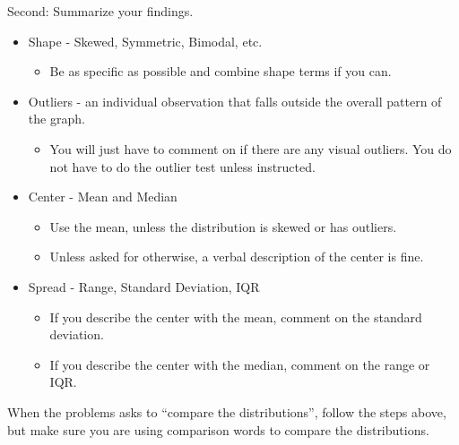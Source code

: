 \documentclass[../stats.tex]{subfiles}
\begin{document}
Second: Summarize your findings. 
\begin{itemize}
    \item Shape - Skewed, Symmetric, Bimodal, etc. 
    \begin{itemize}
        \item Be as specific as possible and combine shape terms if you can.
    \end{itemize}
    \item Outliers - an individual observation that falls outside the overall pattern of the graph.
    \begin{itemize}
        \item You will just have to comment on if there are any visual outliers. You do not have to do the outlier test unless instructed.
    \end{itemize}
    \item Center - Mean and Median 
    \begin{itemize}
        \item Use the mean, unless the distribution is skewed or has outliers. 
        \item Unless asked for otherwise, a verbal description of the center is fine.
    \end{itemize}
    \item Spread - Range, Standard Deviation, IQR 
    \begin{itemize}
        \item If you describe the center with the mean, comment on the standard deviation.
        \item If you describe the center with the median, comment on the range or IQR.
    \end{itemize}
\end{itemize}
When the problems asks to ``compare the distributions'', follow the steps above, but make sure you are using comparison words to compare the distributions.
\end{document}
